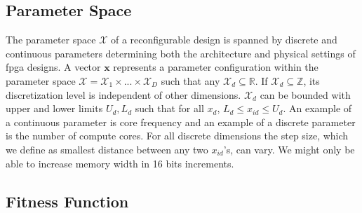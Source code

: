 \documentclass[10pt,conference,a4paper]{IEEEtran}
\begin{document}

\subsection{Parameter Space} 
\label{designspace}

The parameter space $\mathcal{X}$ of a reconfigurable design is spanned by discrete and continuous parameters determining both the architecture and physical settings of \ac{fpga} designs. A vector $\mathbf{x}$ represents a parameter configuration within the parameter space $\mathcal{X} = \mathcal{X}_1 \times ... \times \mathcal{X}_D $ such that any $\mathcal{X}_{d} \subseteq \mathbb{R}$. If $\mathcal{X}_{d} \subseteq \mathbb{Z}$, its discretization level is independent of other dimensions. $\mathcal{X}_{d}$ can be bounded with upper and lower limits $U_d,L_d$ such that for all $x_{d}$, $L_d \leq x_{id} \leq U_d$. An example of a continuous parameter is core frequency and an example of a discrete parameter is the number of compute cores. For all discrete dimensions the step size, which we define as smallest distance between any two $x_{id}$'s, can vary. We might only be able to increase memory width in 16 bits increments. 

 \subsection{Fitness Function}
\label{fitfunction}

\end{document}
